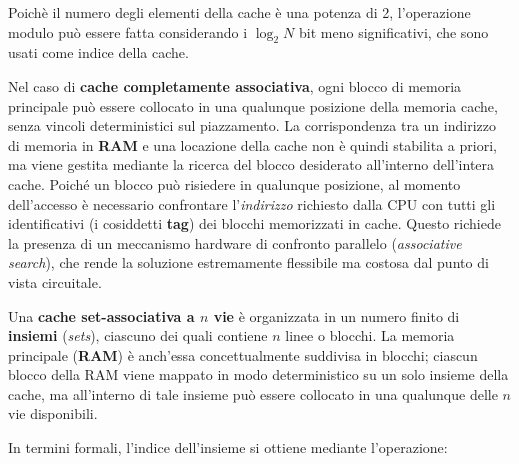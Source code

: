 Poichè il numero degli elementi della cache è una potenza di 2, l'operazione modulo può essere fatta considerando i $\log_2N$ bit meno significativi, che sono usati come indice della cache.  

\begin{figure}[ht]
    \centering
    \setlength{\fboxrule}{0.5pt} %
    \setlength{\fboxsep}{0pt}    %
\end{figure}

\noindent Nel caso di \textbf{cache completamente associativa}, ogni blocco di memoria principale può essere collocato in una qualunque posizione della memoria cache, senza vincoli deterministici sul piazzamento. La corrispondenza tra un indirizzo di memoria in \textbf{RAM} e una locazione della cache non è quindi stabilita a priori, ma viene gestita mediante la ricerca del blocco desiderato all'interno dell'intera cache.  
Poiché un blocco può risiedere in qualunque posizione, al momento dell'accesso è necessario confrontare l'\textit{indirizzo} richiesto dalla CPU con tutti gli identificativi (i cosiddetti \textbf{tag}) dei blocchi memorizzati in cache. Questo richiede la presenza di un meccanismo hardware di confronto parallelo (\textit{associative search}), che rende la soluzione estremamente flessibile ma costosa dal punto di vista circuitale.  

\noindent
Una \textbf{cache set-associativa a $n$ vie} è organizzata in un numero finito di \textbf{insiemi} (\textit{sets}), ciascuno dei quali contiene $n$ linee o blocchi. La memoria principale (\textbf{RAM}) è anch'essa concettualmente suddivisa in blocchi; ciascun blocco della RAM viene mappato in modo deterministico su un solo insieme della cache, ma all'interno di tale insieme può essere collocato in una qualunque delle $n$ vie disponibili.  

\noindent
In termini formali, l'indice dell'insieme si ottiene mediante l'operazione:  


